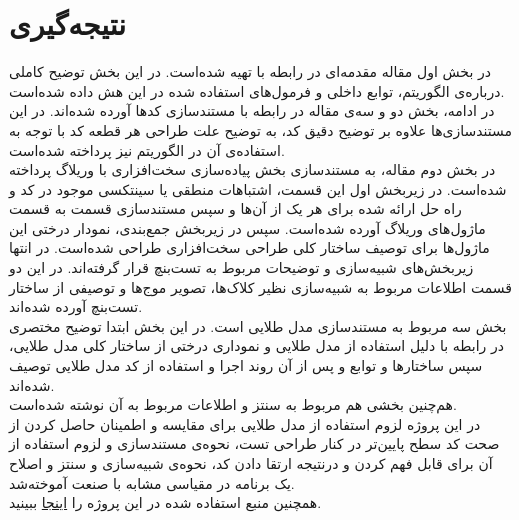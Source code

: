 \chapter{نتیجه‌گیری}


در بخش اول مقاله مقدمه‌ای در رابطه با  تهیه شده‌است. در این بخش توضیح کاملی درباره‌ی الگوریتم، توابع داخلی و فرمول‌های استفاده شده در این هش داده شده‌است.  \\
در ادامه، بخش دو و سه‌ی مقاله در رابطه با مستندسازی کدها آورده شده‌اند. در این مستندساز‌ی‌ها علاوه بر توضیح دقیق کد، به توضیح علت طراحی هر قطعه کد با توجه به استفاده‌ی آن در الگوریتم   نیز پرداخته شده‌است. \\ در بخش دوم مقاله،‌ به مستندسازی بخش پیاده‌سازی سخت‌افزاری با وریلاگ پرداخته شده‌است. در زیربخش اول این قسمت،  اشتباهات منطقی یا سینتکسی موجود در کد و راه حل ارائه شده برای هر یک از آن‌ها و سپس مستندسازی قسمت به قسمت ماژول‌های وریلاگ آورده‌ شده‌است.‌ سپس در زیربخش جمع‌بندی، نمودار درختی این ماژول‌ها برای توصیف ساختار کلی طراحی سخت‌افزاری طراحی شده‌است. در انتها زیربخش‌های شبیه‌سازی و توضیحات مربوط به تست‌بنچ قرار گرفته‌اند. در این دو قسمت اطلاعات مربوط به شبیه‌سازی نظیر کلاک‌ها، تصویر موج‌ها و توصیفی از ساختار تست‌بنچ آورده شده‌اند.  \\ بخش سه مربوط به مستندسازی مدل طلایی است. در این بخش ابتدا توضیح مختصری در رابطه با دلیل استفاده از مدل طلایی و نموداری درختی از ساختار کلی مدل طلایی، سپس ساختارها و توابع و پس از آن روند اجرا و استفاده از کد مدل طلایی توصیف شده‌اند. \\هم‌چنین بخشی هم مربوط به سنتز و اطلاعات مربوط به آن نوشته شده‌است. \\
در این‌ پروژه لزوم استفاده از مدل طلایی برای مقایسه‌ و اطمینان حاصل کردن از صحت کد سطح پایین‌تر در کنار طراحی تست، نحوه‌ی مستندسازی و لزوم استفاده از آن برای قابل فهم کردن  و درنتیجه ارتقا دادن کد، نحوه‌ی شبیه‌سازی و سنتز و اصلاح یک برنامه در مقیاسی مشابه با صنعت آموخته‌شد.\\
همچنین منبع استفاده شده در این پروژه را \hyperref[manba]{اینجا} ببینید.

